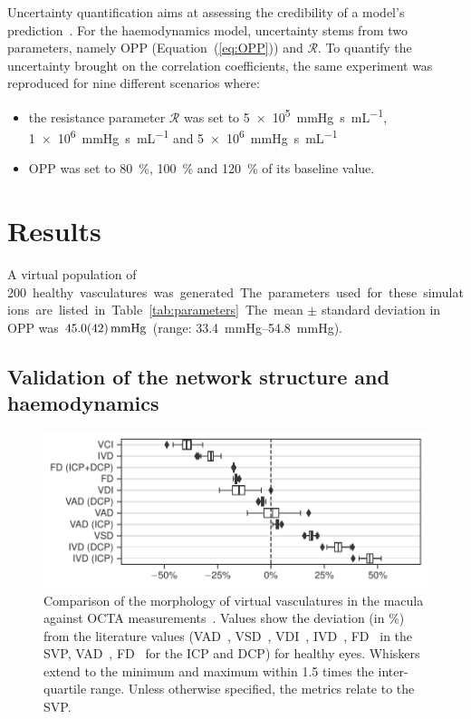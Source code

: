 \documentclass[11pt,]{article}
\begin{document}
Uncertainty quantification aims at assessing the credibility of a model's prediction~\cite{ASME2018,Viceconti2021}.
For the haemodynamics model, uncertainty stems from two parameters, namely OPP (Equation~(\ref{eq:OPP})) and $\mathcal R$.
To quantify the uncertainty brought on the correlation coefficients, the same experiment was reproduced for nine different scenarios where:
\begin{itemize}
\item the resistance parameter $\mathcal R$ was set to \SI[per-mode=symbol]{5e5}{\mmHg\second\per\mL}, \SI[per-mode=symbol]{1e6}{\mmHg\second\per\mL} and \SI[per-mode=symbol]{5e6}{\mmHg\second\per\mL}
\item OPP was set to \SI{80}{\percent}, \SI{100}{\percent} and \SI{120}{\percent} of its baseline value.
\end{itemize}


\section{Results}\label{sec:results}

A virtual population of \SI{200} healthy vasculatures was generated.
The parameters used for these simulations are listed in Table~\ref{tab:parameters}. %
The mean $\pm$ standard deviation in OPP was $\SI{45.0 \pm 4.2}{\mmHg}$ (range: \SIrange{33.4}{54.8}{\mmHg}).

\subsection{Validation of the network structure and haemodynamics}\label{sec:validation}

\begin{figure}[ht!]
  \centering
  \includegraphics[width=.75\textwidth]{Baseline_metrics}
  \caption{\label{fig:OCTAValidation}Comparison of the morphology of virtual vasculatures in the macula against OCTA measurements~\cite{Liu_2021,Ma2021,Mehta_2019}. Values show the deviation (in \%) from the literature values (VAD~\cite{Mehta_2019}, VSD~\cite{Mehta_2019}, VDI~\cite{Mehta_2020}, IVD~\cite{Liu_2021}, FD~\cite{Agarwal_2019} in the SVP, VAD~\cite{Chan2012}, FD~\cite{Agarwal_2019} for the ICP and DCP) for healthy eyes. Whiskers extend to the minimum and maximum within \SI{1.5}{} times the inter-quartile range. Unless otherwise specified, the metrics relate to the SVP.}  
\end{figure}
\end{document}

